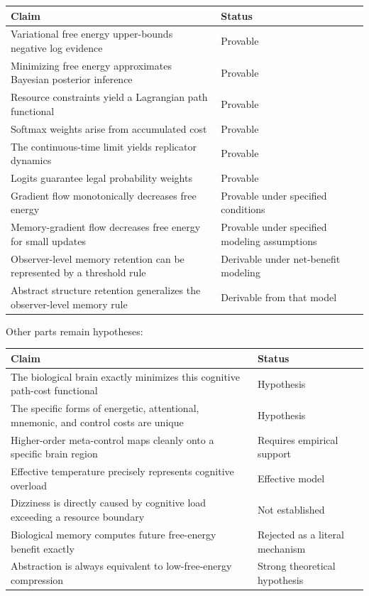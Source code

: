 \documentclass[11pt, a4paper]{article}
\begin{document}
\begin{center}
\begin{tabular}{p{}p{}}
\toprule
\textbf{Claim} & \textbf{Status} \\
\midrule
Variational free energy upper-bounds negative log evidence & Provable \\
Minimizing free energy approximates Bayesian posterior inference & Provable \\
Resource constraints yield a Lagrangian path functional & Provable \\
Softmax weights arise from accumulated cost & Provable \\
The continuous-time limit yields replicator dynamics & Provable \\
Logits guarantee legal probability weights & Provable \\
Gradient flow monotonically decreases free energy & Provable under specified conditions \\
Memory-gradient flow decreases free energy for small updates & Provable under specified modeling assumptions \\
Observer-level memory retention can be represented by a threshold rule & Derivable under net-benefit modeling \\
Abstract structure retention generalizes the observer-level memory rule & Derivable from that model \\
\bottomrule
\end{tabular}
\end{center}

Other parts remain hypotheses:

\begin{center}
\begin{tabular}{p{}p{}}
\toprule
\textbf{Claim} & \textbf{Status} \\
\midrule
The biological brain exactly minimizes this cognitive path-cost functional & Hypothesis \\
The specific forms of energetic, attentional, mnemonic, and control costs are unique & Hypothesis \\
Higher-order meta-control maps cleanly onto a specific brain region & Requires empirical support \\
Effective temperature precisely represents cognitive overload & Effective model \\
Dizziness is directly caused by cognitive load exceeding a resource boundary & Not established \\
Biological memory computes future free-energy benefit exactly & Rejected as a literal mechanism \\
Abstraction is always equivalent to low-free-energy compression & Strong theoretical hypothesis \\
\bottomrule
\end{tabular}
\end{center}
\end{document}
